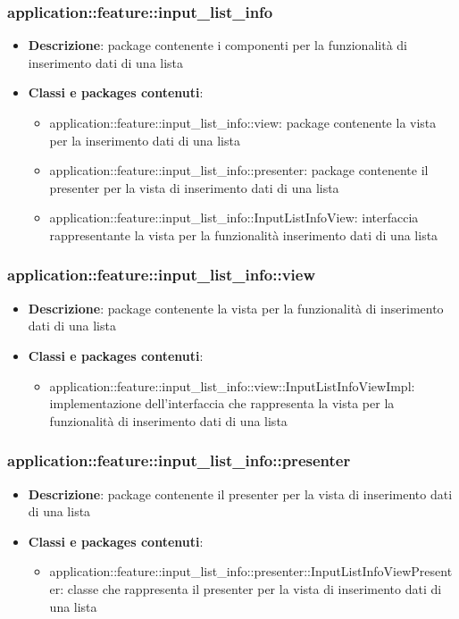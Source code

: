 \subsubsection{application::feature::input\_list\_info}
\begin{itemize}
	\item \textbf{Descrizione}: package contenente i componenti per la funzionalità di inserimento dati di una lista
	\item \textbf{Classi e packages contenuti}:
	\begin{itemize}
	\item application::feature::input\_list\_info::view: package contenente la vista per la inserimento dati di una lista
	\item application::feature::input\_list\_info::presenter: package contenente il presenter per la vista di inserimento dati di una lista
	\item application::feature::input\_list\_info::InputListInfoView: interfaccia rappresentante la vista per la funzionalità inserimento dati di una lista
	\end{itemize}
\end{itemize}

\subsubsection{application::feature::input\_list\_info::view}
\begin{itemize}
	\item \textbf{Descrizione}: package contenente la vista per la funzionalità di inserimento dati di una lista
	\item \textbf{Classi e packages contenuti}:
	\begin{itemize}
	\item application::feature::input\_list\_info::view::InputListInfoViewImpl: implementazione dell'interfaccia che rappresenta la vista per la funzionalità di inserimento dati di una lista
	\end{itemize}
\end{itemize}

\subsubsection{application::feature::input\_list\_info::presenter}
\begin{itemize}
	\item \textbf{Descrizione}: package contenente il presenter per la vista di inserimento dati di una lista
	\item \textbf{Classi e packages contenuti}:
	\begin{itemize}
	\item application::feature::input\_list\_info::presenter::InputListInfoViewPresenter: classe che rappresenta il presenter per la vista di inserimento dati di una lista
	\end{itemize}
\end{itemize}


